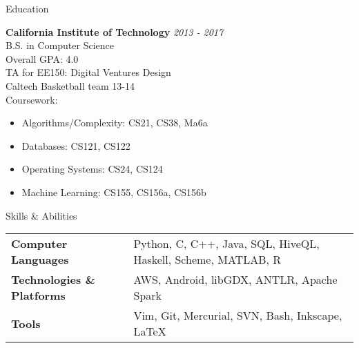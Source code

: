 \documentclass{resume} %
\begin{document}

\begin{rSection}{Education}

{\bf California Institute of Technology} \hfill {\em 2013 - 2017} \\
B.S. in Computer Science  \\
Overall GPA: 4.0 \smallskip \\
TA for EE150: Digital Ventures Design \\
Caltech Basketball team 13-14 \smallskip \\
Coursework:
\vspace{-5.0mm}
\begin{minipage}{0.43\linewidth}
\begin{itemize}
    \item{Algorithms/Complexity: CS21, CS38, Ma6a}
    \item{Databases: CS121, CS122}
\end{itemize}
\end{minipage}
\begin{minipage}{0.43\linewidth}
\begin{itemize}
    \item{Operating Systems: CS24, CS124}
    \item{Machine Learning: CS155, CS156a, CS156b}
\end{itemize}
\end{minipage}
\vspace{5mm}
\end{rSection}


\begin{rSection}{Skills \& Abilities}

\begin{tabularx}{\textwidth}{@{}lX}
    \bfseries{Computer Languages}   &  Python, C, C++, Java, SQL, HiveQL, Haskell, Scheme, MATLAB, R \\
    \bfseries{Technologies \& Platforms}   &   AWS, Android, libGDX, ANTLR, Apache Spark \\
    \bfseries{Tools}   &  Vim, Git, Mercurial, SVN, Bash, Inkscape, \LaTeX \\
\end{tabularx}

\end{rSection}
\end{document}
